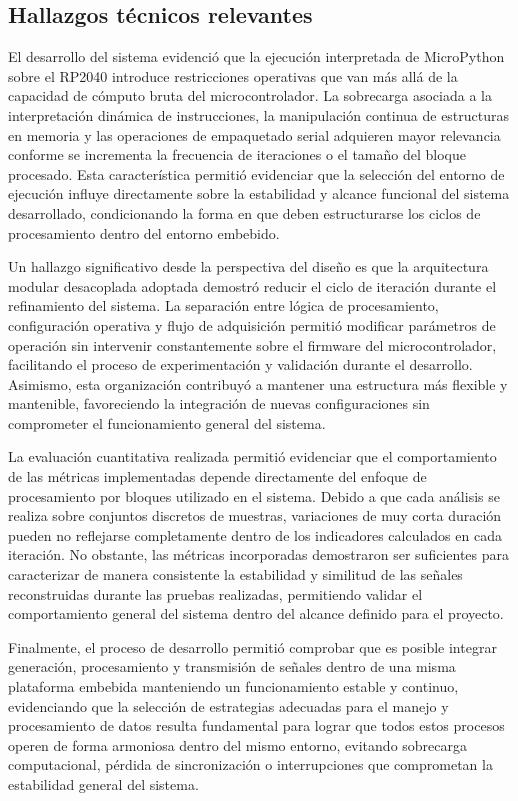 \subsection{Hallazgos técnicos relevantes}

El desarrollo del sistema evidenció que la ejecución interpretada de MicroPython sobre el RP2040 introduce restricciones operativas que van más allá de la capacidad de cómputo bruta del microcontrolador. La sobrecarga asociada a la interpretación dinámica de instrucciones, la manipulación continua de estructuras en memoria y las operaciones de empaquetado serial adquieren mayor relevancia conforme se incrementa la frecuencia de iteraciones o el tamaño del bloque procesado. Esta característica permitió evidenciar que la selección del entorno de ejecución influye directamente sobre la estabilidad y alcance funcional del sistema desarrollado, condicionando la forma en que deben estructurarse los ciclos de procesamiento dentro del entorno embebido.

Un hallazgo significativo desde la perspectiva del diseño es que la arquitectura modular desacoplada adoptada demostró reducir el ciclo de iteración durante el refinamiento del sistema. La separación entre lógica de procesamiento, configuración operativa y flujo de adquisición permitió modificar parámetros de operación sin intervenir constantemente sobre el firmware del microcontrolador, facilitando el proceso de experimentación y validación durante el desarrollo. Asimismo, esta organización contribuyó a mantener una estructura más flexible y mantenible, favoreciendo la integración de nuevas configuraciones sin comprometer el funcionamiento general del sistema.

La evaluación cuantitativa realizada permitió evidenciar que el comportamiento de las métricas implementadas depende directamente del enfoque de procesamiento por bloques utilizado en el sistema. Debido a que cada análisis se realiza sobre conjuntos discretos de muestras, variaciones de muy corta duración pueden no reflejarse completamente dentro de los indicadores calculados en cada iteración. No obstante, las métricas incorporadas demostraron ser suficientes para caracterizar de manera consistente la estabilidad y similitud de las señales reconstruidas durante las pruebas realizadas, permitiendo validar el comportamiento general del sistema dentro del alcance definido para el proyecto.

Finalmente, el proceso de desarrollo permitió comprobar que es posible integrar generación, procesamiento y transmisión de señales dentro de una misma plataforma embebida manteniendo un funcionamiento estable y continuo, evidenciando que la selección de estrategias adecuadas para el manejo y procesamiento de datos resulta fundamental para lograr que todos estos procesos operen de forma armoniosa dentro del mismo entorno, evitando sobrecarga computacional, pérdida de sincronización o interrupciones que comprometan la estabilidad general del sistema.

